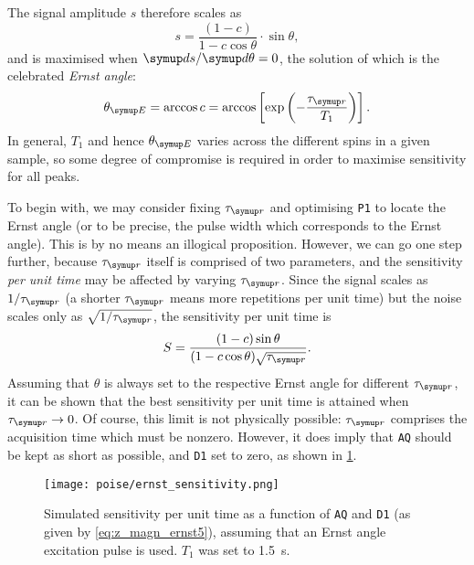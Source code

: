 The signal amplitude $s$ therefore scales as
\begin{equation}
    \label{eq:z_magn_ernst4}
    s = \frac{(1 - c)}{1 - c\cos\theta} \cdot \sin\theta,
\end{equation}
and is maximised when $\md s/\md \theta = 0$, the solution of which is the celebrated \textit{Ernst angle}\autocite{Ernst1966RSI}:
\begin{equation}
    \label{eq:ernst_angle}
    \thetaE = \arccos{c} = \arccos\left[\exp\left(-\frac{\taur}{T_1}\right)\right].
\end{equation}
In general, $T_1$ and hence $\thetaE$ varies across the different spins in a given sample, so some degree of compromise is required in order to maximise sensitivity for all peaks.

To begin with, we may consider fixing $\taur$ and optimising \texttt{P1} to locate the Ernst angle (or to be precise, the pulse width which corresponds to the Ernst angle).
This is by no means an illogical proposition.
However, we can go one step further, because $\taur$ itself is comprised of two parameters, and the sensitivity \textit{per unit time} may be affected by varying $\taur$.
Since the signal scales as $1/\taur$ (a shorter $\taur$ means more repetitions per unit time) but the noise scales only as $\sqrt{1/\taur}$, the sensitivity per unit time is
\begin{equation}
    \label{eq:z_magn_ernst5}
    S = \frac{(1 - c)\sin\theta}{(1 - c\cos\theta)\sqrt{\taur}}.
\end{equation}
Assuming that $\theta$ is always set to the respective Ernst angle for different $\taur$, it can be shown that the best sensitivity per unit time is attained when $\taur \to 0$.\autocite{Waugh1970JMS,Traficante1992CMR}
Of course, this limit is not physically possible: $\taur$ comprises the acquisition time which must be nonzero.
However, it does imply that \texttt{AQ} should be kept as short as possible, and \texttt{D1} set to zero, as shown in \cref{fig:ernst_sensitivity}.

\begin{figure}[htb]
    \centering
    \texttt{[image: poise/ernst\_sensitivity.png]}%
    \caption[Sensitivity per unit time as a function of \texttt{AQ} and \texttt{D1}]{Simulated sensitivity per unit time as a function of \texttt{AQ} and \texttt{D1} (as given by \cref{eq:z_magn_ernst5}), assuming that an Ernst angle excitation pulse is used. $T_1$ was set to \qty{1.5}{\s}.}
    \label{fig:ernst_sensitivity}
\end{figure}


